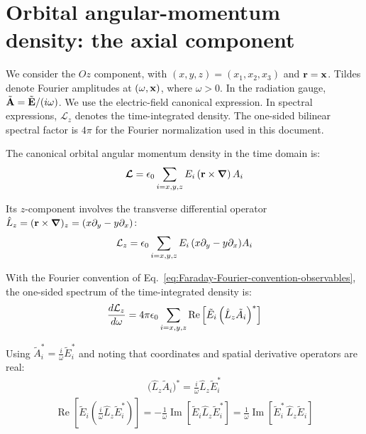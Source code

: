 \section{Orbital angular-momentum density: the axial component}
\label{sec:canonical-oam-density-and_flux}

We consider the $Oz$ component, with $(x,y,z)=(x_1,x_2,x_3)$ and
${\bf r}={\bf x}$.  Tildes denote Fourier amplitudes at $(\omega,{\bf x})$,
where $\omega>0$.  In the radiation gauge,
$\tilde{\bf A}=\tilde{\bf E}/(i\omega)$.
We use the electric-field canonical expression.  In spectral expressions,
$\mathcal L_z$ denotes the time-integrated density.  The one-sided bilinear
spectral factor is $4\pi$ for the Fourier normalization used in this document.

The canonical orbital angular momentum density in the time domain is:
\begin{align}
  {\boldsymbol{\mathcal L}} = \epsilon_0 \sum_{i=x,y,z} E_i\, ({\bf r}\times{\boldsymbol{\nabla}})\, A_i
\end{align}

Its $z$-component involves the transverse differential operator $\hat{L}_z = ({\bf r}\times{\boldsymbol{\nabla}})_z = (x\partial_y - y\partial_x)$:
\begin{align}
  {\cal L}_z = \epsilon_0 \sum_{i=x,y,z} E_i\, (x\partial_y - y\partial_x) A_i
\end{align}

With the Fourier convention of Eq.~\eqref{eq:Faraday-Fourier-convention-observables}, the one-sided spectrum of the time-integrated density is:
\begin{align}
  \frac{d {\cal L}_z}{d\omega} = 4\pi\epsilon_0 \sum_{i=x,y,z} \operatorname{Re}\left[\tilde E_i\, \Big(\hat{L}_z \tilde A_i\Big)^*\right]
\end{align}

Using $\tilde A_i^* = \frac{i}{\omega}\tilde E_i^*$ and noting that coordinates and spatial derivative operators are real:
\begin{align}
  \Big(\hat{L}_z \tilde A_i\Big)^* = \frac{i}{\omega}\hat{L}_z \tilde E_i^*
\end{align}
\begin{align}
  \operatorname{Re}\left[\tilde E_i \left(\frac{i}{\omega}\hat{L}_z \tilde E_i^*\right)\right] = -\frac{1}{\omega}\operatorname{Im}\left[\tilde E_i \hat{L}_z \tilde E_i^*\right] = \frac{1}{\omega}\operatorname{Im}\left[\tilde E_i^*\, \hat{L}_z \tilde E_i\right]
\end{align}


